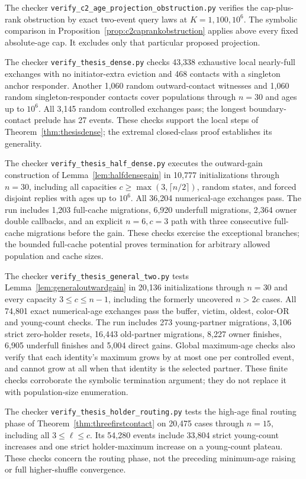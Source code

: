 \documentclass[11pt]{article}
\begin{document}
The checker \texttt{verify\_c2\_age\_projection\_obstruction.py}
verifies the cap-plus-rank obstruction by exact two-event
query laws at $K=1,100,10^6$. The symbolic comparison in
Proposition~\ref{prop:c2caprankobstruction} applies above
every fixed absolute-age cap. It excludes only that
particular proposed projection.

The checker \texttt{verify\_thesis\_dense.py} checks
43,338 exhaustive local nearly-full exchanges with no
initiator-extra eviction and 468 contacts with a singleton
anchor responder. Another 1,060 random outward-contact
witnesses and 1,060 random singleton-responder contacts
cover populations through $n=30$ and ages up to $10^6$.
All 3,145 random controlled exchanges pass; the longest
boundary-contact prelude has 27 events. These checks
support the local steps of Theorem~\ref{thm:thesisdense};
the extremal closed-class proof establishes its generality.

The checker \texttt{verify\_thesis\_half\_dense.py}
executes the outward-gain construction of
Lemma~\ref{lem:halfdensegain} in 10,777 initializations
through $n=30$, including all capacities
$c\ge\max(3,\lceil n/2\rceil)$, random states, and
forced disjoint replies with ages up to $10^6$.
All 36,204 numerical-age exchanges pass. The run
includes 1,203 full-cache migrations, 6,920 underfull
migrations, 2,364 owner double callbacks, and an
explicit $n=6,c=3$ path with three consecutive
full-cache migrations before the gain. These checks
exercise the exceptional branches; the bounded
full-cache potential proves termination for arbitrary
allowed population and cache sizes.

The checker \texttt{verify\_thesis\_general\_two.py}
tests Lemma~\ref{lem:generaloutwardgain} in 20,136
initializations through $n=30$ and every capacity
$3\le c\le n-1$, including the formerly uncovered
$n>2c$ cases. All 74,801 exact numerical-age exchanges
pass the buffer, victim, oldest, color-OR and
young-count checks. The run includes 273 young-partner
migrations, 3,106 strict zero-holder resets, 16,443
old-partner migrations, 8,227 owner finishes, 6,905
underfull finishes and 5,004 direct gains. Global
maximum-age checks also verify that each identity's
maximum grows by at most one per controlled event,
and cannot grow at all when that identity is the
selected partner. These finite checks corroborate
the symbolic termination argument; they do not
replace it with population-size enumeration.

The checker \texttt{verify\_thesis\_holder\_routing.py}
tests the high-age final routing phase of
Theorem~\ref{thm:threefirstcontact} on 20,475 cases
through $n=15$, including all $3\le\ell\le c$.
Its 54,280 events include 33,804 strict young-count
increases and one strict holder-maximum increase on
a young-count plateau. These checks concern the
routing phase, not the preceding minimum-age raising
or full higher-shuffle convergence.
\end{document}
